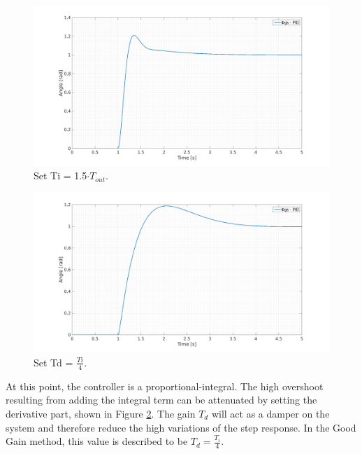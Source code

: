 \begin{figure}[H]
  \centering
  \includegraphics[scale=0.32]{figures/GG3.png}
  \caption{Set Ti = 1.5$\cdot T_{out}$.}
  \label{fig:subim3}
\end{figure}

\begin{figure}[H]
  \centering
  \includegraphics[scale=0.32]{figures/GG4.png}
  \caption{Set Td = $\frac{Ti}{4}$.}
  \label{fig:subim4}
\end{figure}


At this point, the controller is a proportional-integral. The high overshoot resulting from adding the integral term can be attenuated by setting the derivative part, shown in Figure \ref{fig:subim4}. The gain $T_d$ will act as a damper on the system and therefore reduce the high variations of the step response. In the Good Gain method, this value is described to be $T_d = \frac{T_i}{4}$.


